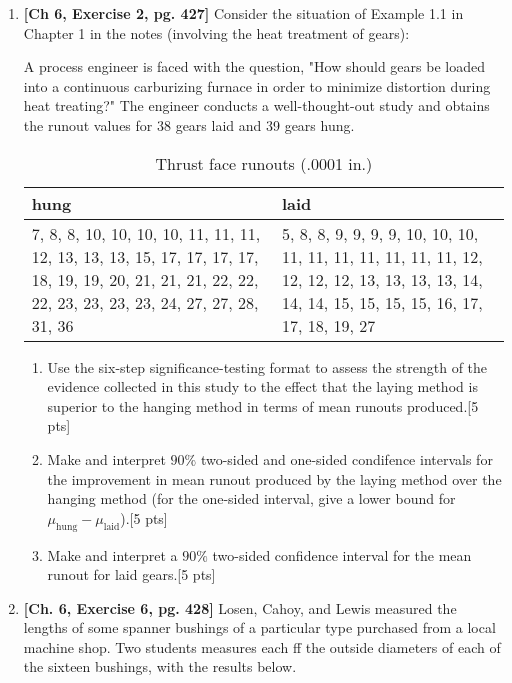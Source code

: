 \documentclass[11pt]{article}\usepackage[]{graphicx}\usepackage[]{color}
\begin{document}
\begin{enumerate}
	
    \item \textbf{[Ch 6, Exercise 2, pg. 427]} Consider the situation of Example 1.1 in Chapter 1 in the notes (involving the heat treatment of gears):



A process engineer is faced with the question, "How should gears be loaded into a continuous carburizing furnace in order to minimize distortion during heat treating?" The engineer conducts a well-thought-out study and obtains the runout values for 38 gears laid and 39 gears hung.


\begin{table}[ht]
\centering
\begin{tabular}{p{1in}p{1in}}
\hline
hung & laid \\
\hline
7, 8, 8, 10, 10, 10, 10, 11, 11, 11, 12, 13, 13, 13, 15, 17, 17, 17, 17, 18, 19, 19, 20, 21, 21, 21, 22, 22, 22, 23, 23, 23, 23, 24, 27, 27, 28, 31, 36 & 5, 8, 8, 9, 9, 9, 9, 10, 10, 10, 11, 11, 11, 11, 11, 11, 11, 12, 12, 12, 12, 13, 13, 13, 13, 14, 14, 14, 15, 15, 15, 15, 16, 17, 17, 18, 19, 27 \\
\hline
\end{tabular}
\caption{Thrust face runouts (.0001 in.)}
\end{table}

\begin{enumerate}     
  \item Use the six-step significance-testing format to assess the strength of the evidence collected in this study to the effect that the laying method is superior to the hanging method in terms of mean runouts produced.[5 pts]
    
  \item Make and interpret $90 \%$ two-sided and one-sided condifence intervals for the improvement in mean runout produced by the laying method over the hanging method (for the one-sided interval, give a lower bound for $\mu_{\text{hung}} - \mu_{\text{laid}}$).[5 pts]
    
  \item Make and interpret a $90 \%$ two-sided confidence interval for the mean runout for laid gears.[5 pts]
\end{enumerate}

\item \textbf{[Ch. 6, Exercise 6, pg. 428]} Losen, Cahoy, and Lewis measured the lengths of some spanner bushings of a particular type purchased from a local machine shop. Two students measures each ff the outside diameters of each of the sixteen bushings, with the results below.




\end{enumerate}
\end{document}
